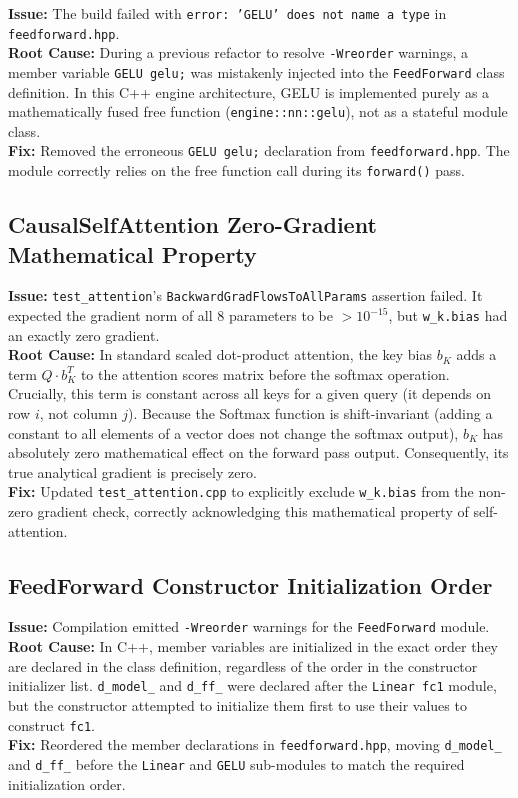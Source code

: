\documentclass[12pt, a4paper]{article}
\begin{document}
\textbf{Issue:} The build failed with \texttt{error: 'GELU' does not name a type} in \texttt{feedforward.hpp}. \\
\textbf{Root Cause:} During a previous refactor to resolve \texttt{-Wreorder} warnings, a member variable \texttt{GELU gelu;} was mistakenly injected into the \texttt{FeedForward} class definition. In this C++ engine architecture, GELU is implemented purely as a mathematically fused free function (\texttt{engine::nn::gelu}), not as a stateful module class. \\
\textbf{Fix:} Removed the erroneous \texttt{GELU gelu;} declaration from \texttt{feedforward.hpp}. The module correctly relies on the free function call during its \texttt{forward()} pass.

\subsection{CausalSelfAttention Zero-Gradient Mathematical Property}

\textbf{Issue:} \texttt{test\_attention}'s \texttt{BackwardGradFlowsToAllParams} assertion failed. It expected the gradient norm of all 8 parameters to be $> 10^{-15}$, but \texttt{w\_k.bias} had an exactly zero gradient. \\
\textbf{Root Cause:} In standard scaled dot-product attention, the key bias $b_K$ adds a term $Q \cdot b_K^T$ to the attention scores matrix before the softmax operation. Crucially, this term is constant across all keys for a given query (it depends on row $i$, not column $j$). Because the Softmax function is shift-invariant (adding a constant to all elements of a vector does not change the softmax output), $b_K$ has absolutely zero mathematical effect on the forward pass output. Consequently, its true analytical gradient is precisely zero. \\
\textbf{Fix:} Updated \texttt{test\_attention.cpp} to explicitly exclude \texttt{w\_k.bias} from the non-zero gradient check, correctly acknowledging this mathematical property of self-attention.

\subsection{FeedForward Constructor Initialization Order}

\textbf{Issue:} Compilation emitted \texttt{-Wreorder} warnings for the \texttt{FeedForward} module. \\
\textbf{Root Cause:} In C++, member variables are initialized in the exact order they are declared in the class definition, regardless of the order in the constructor initializer list. \texttt{d\_model\_} and \texttt{d\_ff\_} were declared after the \texttt{Linear fc1} module, but the constructor attempted to initialize them first to use their values to construct \texttt{fc1}. \\
\textbf{Fix:} Reordered the member declarations in \texttt{feedforward.hpp}, moving \texttt{d\_model\_} and \texttt{d\_ff\_} before the \texttt{Linear} and \texttt{GELU} sub-modules to match the required initialization order.
\end{document}
